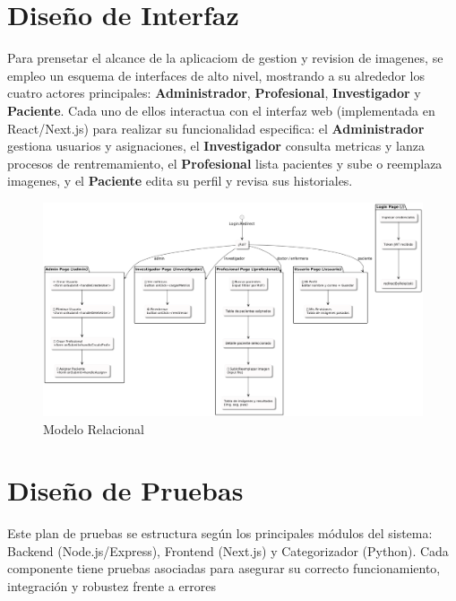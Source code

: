 \section{Diseño de Interfaz}
\label{sc:DI}

Para prensetar el alcance de la aplicaciom de gestion y revision de imagenes, se empleo un esquema de interfaces de alto nivel, mostrando a su alrededor los cuatro actores principales: \textbf{Administrador}, \textbf{Profesional}, \textbf{Investigador} y \textbf{Paciente}. Cada uno de ellos interactua con el interfaz web (implementada en React/Next.js) para realizar su funcionalidad especifica: el \textbf{Administrador} gestiona usuarios y asignaciones, el \textbf{Investigador} consulta metricas y lanza procesos de rentremamiento, el \textbf{Profesional} lista pacientes y sube o reemplaza imagenes, y el \textbf{Paciente} edita su perfil y revisa sus historiales.


\begin{figure}[H]
    \centering
    \includegraphics[width=1\linewidth]{imagenes/esquema.png}
    \caption{Modelo Relacional}
    \label{fig:classesDiagram}
\end{figure}




\section{Diseño de Pruebas}
\label{sc:DP}

Este plan de pruebas se estructura según los principales módulos del sistema: Backend (Node.js/Express), Frontend (Next.js) y Categorizador (Python). Cada componente tiene pruebas asociadas para asegurar su correcto funcionamiento, integración y robustez frente a errores

